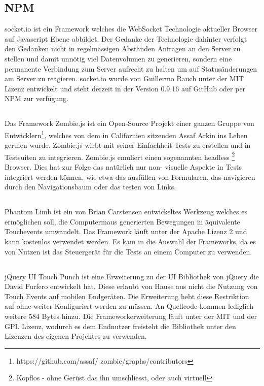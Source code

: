 	\subsection{NPM }
	socket.io ist ein Framework welches die WebSocket Technologie aktueller Browser auf Javascript Ebene abbildet. Der Gedanke 	der Technologie dahinter verfolgt den Gedanken nicht in regelmässigen Abständen Anfragen an den Server zu stellen und damit 	unnötig viel Datenvolumen zu generieren, sondern eine permanente Verbindung zum Server aufrecht zu halten um auf 			Statusänderungen am Server zu reagieren. socket.io wurde von Guillermo Rauch unter der MIT Lizenz entwickelt und steht 		derzeit in der Version 0.9.16 auf GitHub oder per NPM zur verfügung.
	
	\subsection{}
	Das Framework Zombie.js ist ein Open-Source Projekt einer ganzen Gruppe von Entwicklern\footnote{https://github.com/assaf/	zombie/graphs/contributors}, welches von dem in Californien sitzenden Assaf Arkin ins Leben gerufen wurde. Zombie.js wirbt mit 	seiner Einfachheit Tests zu erstellen und in Testsuiten zu integrieren. Zombie.js emuliert einen sogenannten headless			\footnote{Kopflos - ohne Gerüst das ihn umschliesst, oder auch virtuell} Browser. Dies hat zur Folge das natürlich nur non-		visuelle Aspekte in Tests integriert werden können, wie etwa das ausfüllen von Formularen, das navigieren durch den 			Navigationsbaum oder das testen von Links.

	\subsection{}
	Phantom Limb ist ein von Brian Carstensen entwickeltes Werkzeug welches es ermöglichen soll, die Computermaus generierten 	Bewegungen in äquivalente Touchevents umwandelt. Das Framework läuft unter der Apache Lizenz 2 und kann kostenlos 		verwendet werden. Es kam in die Auswahl der Frameworks, da es von Nutzen ist das Steuergerät für die Tests an einem 			Computer zu verwenden.
	
	\subsection{}
	jQuery UI Touch Punch ist eine Erweiterung zu der UI Bibliothek von jQuery die David Furfero entwickelt hat. Diese erlaubt von 	Hause aus nicht die Nutzung von Touch Events auf mobilen Endgeräten. Die Erweiterung hebt diese Restriktion auf ohne weiter 	Konfiguriert werden zu müssen. An Quellcode kommen lediglich weitere 584 Bytes hinzu. Die Frameworkerweiterung läuft unter 	der MIT und der GPL Lizenz, wodurch es dem Endnutzer freisteht die Bibliothek unter den Lizenzen des eigenen Projektes zu 		verwenden.
	
